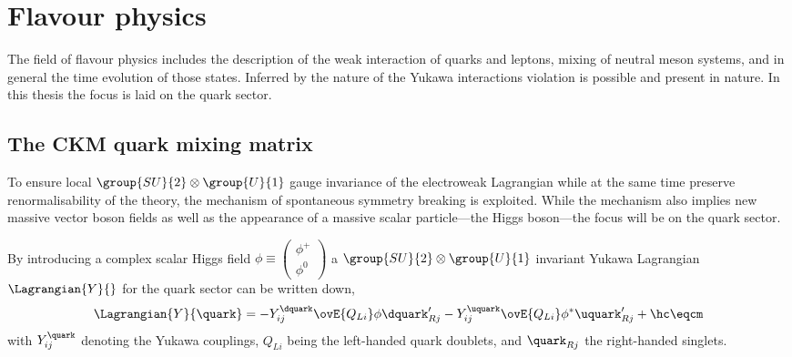 
\section{Flavour physics}
\label{sec:cpv_theory:flavour_physics}

The field of flavour physics includes the description of the weak interaction of
quarks and leptons, mixing of neutral meson systems, and in general the time
evolution of those states. Inferred by the nature of the Yukawa interactions \CP
violation is possible and present in nature. In this thesis the focus is laid on
the quark sector.

\subsection{The \acs{CKM} quark mixing matrix}
\label{sec:cpv_theory:flavour_physics:ckm_matrix}

To ensure local $\group{SU}{2}\otimes\group{U}{1}$ gauge invariance of the
electroweak Lagrangian while at the same time preserve renormalisability of the
theory, the mechanism of spontaneous symmetry breaking is exploited. While the
mechanism also implies new massive vector boson fields as well as the appearance
of a massive scalar particle---the Higgs boson---the focus will be on the quark
sector.

By introducing a complex scalar Higgs field $\phi \equiv
\left(\begin{smallmatrix} \phi ^{+} \\ \phi^{0}\end{smallmatrix}\right)$ a
$\group{SU}{2}\otimes\group{U}{1}$ invariant Yukawa Lagrangian
$\Lagrangian{Y}{}$ for the quark sector can be written down,
%
\begin{equation}\label{sec:cpv_theory:flavour_physics:ckm_matrix:yukawa_lagrangian}
  \Lagrangian{Y}{\quark} = -Y_{ij}^{\dquark} \ovE{Q_{Li}} \phi \dquark_{Rj}^{\prime} - Y_{ij}^{\uquark} \ovE{Q_{Li}} \phi^{\ast} \uquark_{Rj}^{\prime} + \hc \eqcm
\end{equation}
%
with $Y_{ij}^{\quark}$ denoting the Yukawa couplings, $Q_{Li}$ being the
left-handed quark doublets, and $\quark_{Rj}$ the right-handed singlets. 

